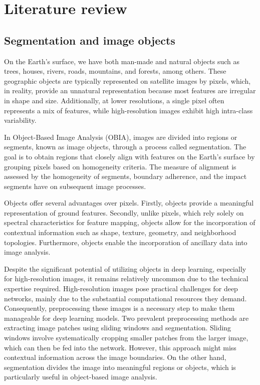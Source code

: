 \chapter{Literature review}


\section{Segmentation and image objects}
On the Earth's surface, we have both man-made and natural objects such as trees, houses, rivers, roads, mountains, and forests, among others. These geographic objects are typically represented on satellite images by pixels, which, in reality, provide an unnatural representation because most features are irregular in shape and size. Additionally, at lower resolutions, a single pixel often represents a mix of features, while high-resolution images exhibit high intra-class variability.

In Object-Based Image Analysis (OBIA), images are divided into regions or segments, known as image objects, through a process called segmentation. The goal is to obtain regions that closely align with features on the Earth's surface by grouping pixels based on homogeneity criteria. The measure of alignment is assessed by the homogeneity of segments, boundary adherence, and the impact segments have on subsequent image processes\cite{audebert_how_2016}.

Objects offer several advantages over pixels. Firstly, objects provide a meaningful representation of ground features. Secondly, unlike pixels, which rely solely on spectral characteristics for feature mapping, objects allow for the incorporation of contextual information such as shape, texture, geometry, and neighborhood topologies\cite{lang_object_2010}. Furthermore, objects enable the incorporation of ancillary data into image analysis\cite{kressler_object-oriented_2008}.

Despite the significant potential of utilizing objects in deep learning, especially for high-resolution images, it remains relatively uncommon due to the technical expertise required. High-resolution images pose practical challenges for deep networks, mainly due to the substantial computational resources they demand. Consequently, preprocessing these images is a necessary step to make them manageable for deep learning models. Two prevalent preprocessing methods are extracting image patches using sliding windows and segmentation. Sliding windows involve systematically cropping smaller patches from the larger image, which can then be fed into the network. However, this approach might miss contextual information across the image boundaries. On the other hand, segmentation divides the image into meaningful regions or objects, which is particularly useful in object-based image analysis\cite{hao_land-use_2024}. 

